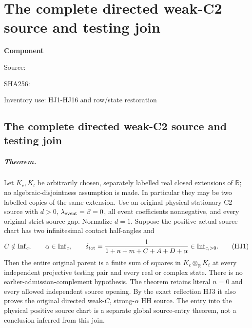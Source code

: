 \chapter{The complete directed weak-C2 source and testing join}
\label{component:pec6c617d3a3d}
\noindent\textbf{Component }\par
{\small\noindent Source: \par}
{\small\noindent SHA256: \par}
{\small\noindent Inventory use: HJ1-HJ16 and row/state restoration\par}
\medskip
\section{The complete directed weak-C2 source and testing join}
\label{pec6c617d3a3d:sec:weak-c2-complete-join-rederived}

\paragraph{Theorem.}
Let \(K_c,K_t\) be arbitrarily chosen, separately labelled
real closed extensions of \(\mathbb R\); no
algebraic-disjointness assumption is made.  In particular
they may be two labelled copies of the same extension.
Use an original physical stationary C2 source
with \(d>0\), \(\lambda_{\rm event}=\beta=0\), all event
coefficients nonnegative, and every original strict source gap.
Normalize \(d=1\).  Suppose the positive actual source chart
has two infinitesimal contact half-angles and
\[
 C\notin\mathrm{Inf}_c,\qquad
 \alpha\in\mathrm{Inf}_c,\qquad
 \delta_{\rm tot}
   =\frac1{1+n+m+C+A+D+\alpha}\in\mathrm{Inf}_{c,>0}.
 \tag{HJ1}
\]
Then the entire original parent is a finite sum of squares in
\(K_c\otimes_{\mathbb R}K_t\) at every independent projective
testing pair and every real or complex state.
There is no earlier-admission-complement hypothesis.
The theorem retains literal \(n=0\) and every allowed
independent source opening.
By the exact reflection HJ3 it also proves the original
directed weak-\(C\), strong-\(\alpha\) HH source.
The entry into the physical positive source chart is a
separate global source-entry theorem, not a conclusion
inferred from this join.

